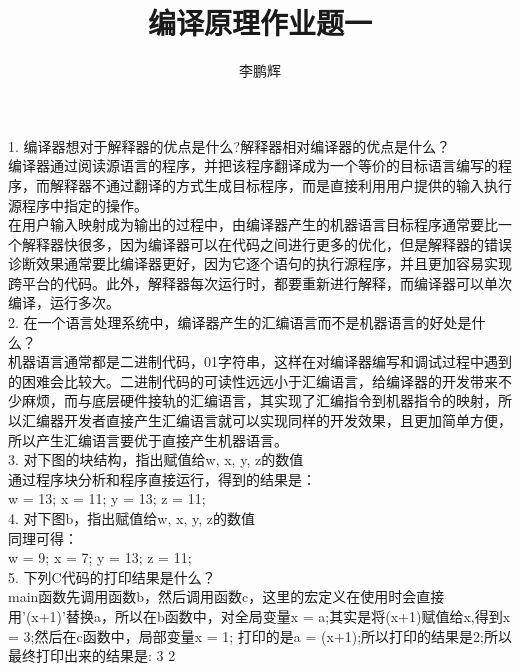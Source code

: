 \documentclass[a4paper， 16pt]{article}
\title{编译原理作业题一}
\author{李鹏辉}
\begin{document}
\maketitle

\begin{Large}
1. 编译器想对于解释器的优点是什么?解释器相对编译器的优点是什么？\\

	编译器通过阅读源语言的程序，并把该程序翻译成为一个等价的目标语言编写的程序，而解释器不通过翻译的方式生成目标程序，而是直接利用用户提供的输入执行源程序中指定的操作。\\
	
	在用户输入映射成为输出的过程中，由编译器产生的机器语言目标程序通常要比一个解释器快很多，因为编译器可以在代码之间进行更多的优化，但是解释器的错误诊断效果通常要比编译器更好，因为它逐个语句的执行源程序，并且更加容易实现跨平台的代码。此外，解释器每次运行时，都要重新进行解释，而编译器可以单次编译，运行多次。\\

2. 在一个语言处理系统中，编译器产生的汇编语言而不是机器语言的好处是什么？\\

	机器语言通常都是二进制代码，01字符串，这样在对编译器编写和调试过程中遇到的困难会比较大。二进制代码的可读性远远小于汇编语言，给编译器的开发带来不少麻烦，而与底层硬件接轨的汇编语言，其实现了汇编指令到机器指令的映射，所以汇编器开发者直接产生汇编语言就可以实现同样的开发效果，且更加简单方便，所以产生汇编语言要优于直接产生机器语言。\\

3. 对下图的块结构，指出赋值给w, x, y, z的数值\\

	通过程序块分析和程序直接运行，得到的结果是：\\
	
	w = 13; x = 11; y = 13; z = 11;\\
	
	
4. 对下图b，指出赋值给w, x, y, z的数值\\
	
	同理可得：\\
	
	w = 9; x = 7; y = 13; z = 11;\\
	
5. 下列C代码的打印结果是什么？\\

	main函数先调用函数b，然后调用函数c，这里的宏定义在使用时会直接用'(x+1)'替换a，所以在b函数中，对全局变量x = a;其实是将(x+1)赋值给x,得到x = 3;然后在c函数中，局部变量x = 1; 打印的是a = (x+1);所以打印的结果是2;所以最终打印出来的结果是: 3 2
	
\end{Large}
\end{document}
